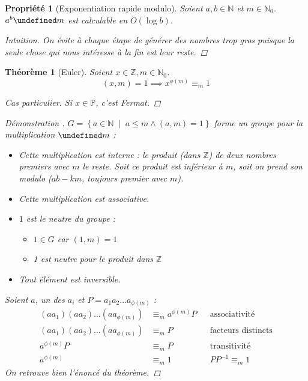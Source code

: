 \documentclass[11pt,twocolumn]{article}
\let\mod\undefined
\DeclareMathOperator{\mod}{mod}
\theoremstyle{plain}
\newtheorem{pr}{Propriété}
\newtheorem{thm}{Théorème}
\newcommand{\esP}{\mathbb{P}} %
\newcommand{\esN}{\mathbb{N}} %
\newcommand{\esZ}{\mathbb{Z}} %
\newenvironment{cproof}[1]{\begin{proof}[Démonstration \cite{#1}]}{\end{proof}}
\begin{document}
\begin{pr}[Exponentiation rapide modulo]
	Soient $a,b \in \esN$ et $m \in \esN_0$.
	$a^b \mod m$ est calculable en $O(\log b)$.
	\begin{proof}[Intuition]
		On évite à chaque étape de générer des nombres trop gros puisque
		la seule chose qui nous intéresse à la fin est leur reste.
	\end{proof}
\end{pr}
\begin{thm}[Euler]
	Soient $x \in \esZ, m \in \esN_0$. \[
		(x,m) = 1 \implies x^{\phi(m)} \equiv_m 1
	\]
	\begin{proof}[Cas particulier]
		Si $x \in \esP$, c'est Fermat.
	\end{proof}
	\begin{cproof}{Buys}
		$G=\left\{a\in\esN \; \middle| \; a \leq m \land (a,m)=1\right\}$
		forme un groupe pour la multiplication $\mod m$ :
		\begin{itemize}
			\item Cette multiplication est interne : le produit (dans $\esZ$)
				de deux nombres premiers avec $m$ le reste.
				Soit ce produit est inférieur à $m$,
				soit on prend son modulo ($ab-km$, toujours premier avec $m$).
			\item Cette multiplication est associative.
			\item $1$ est le neutre du groupe :
				\begin{itemize}
					\item $1\in G$ car $(1,m)=1$
					\item 1 est neutre pour le produit dans $\esZ$
				\end{itemize}
			\item Tout élément est inversible.
		\end{itemize}
		Soient $a$, un des $a_i$ et $P=a_1a_2\dots a_{\phi(m)}$ :
		\begin{align*}
			\left(aa_1\right)\left(aa_2\right)\dots\left(aa_{\phi(m)}\right)
			&\equiv_m a^{\phi(m)}P && \text{associativité} \\
			\left(aa_1\right)\left(aa_2\right)\dots\left(aa_{\phi(m)}\right)
			&\equiv_m P && \text{facteurs distincts} \\
			a^{\phi(m)}P &\equiv_m P && \text{transitivité} \\
			a^{\phi(m)} &\equiv_m 1 && PP^{-1}\equiv_m1
		\end{align*}
		On retrouve bien l'énoncé du théorème.
	\end{cproof}
\end{thm}
\end{document}
